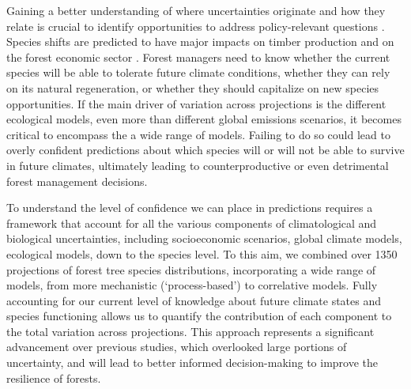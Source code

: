 \documentclass[11pt,letter]{article}
\begin{document}
Gaining a better understanding of where uncertainties originate and how they relate is crucial to identify opportunities 
to address policy-relevant questions \citep{Urban2016, Saltelli2020, Johnson2024}. Species shifts are predicted to have major impacts on timber production and on the forest economic sector \citep{Wessely2024, Hanewinkel2013}. Forest managers need to know whether the current species will be able to tolerate future climate conditions, whether they can rely on its natural regeneration, or whether they should capitalize on new species opportunities. If the main driver of variation across projections is the different ecological models, even more than different global emissions scenarios, it becomes critical to encompass the a wide range of models. Failing to do so could lead to overly confident predictions about which species will or will not be able to survive in future climates, ultimately leading to counterproductive or even detrimental forest management decisions.

To understand the level of confidence we can place in predictions requires a framework that account for all the various components of climatological and biological uncertainties, including socioeconomic scenarios, global climate models, ecological models, down to the species level. To this aim, we combined over 1350 projections of forest tree species distributions, incorporating a wide range of models, from more mechanistic (‘process-based’) to correlative models. Fully accounting for our current level of knowledge about future climate states and species functioning allows us to quantify the contribution of each component to the total variation across projections. This approach represents a significant advancement over previous studies, which overlooked large portions of uncertainty, and will lead to better informed decision-making to improve the resilience of forests.

\end{document}
